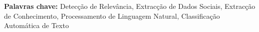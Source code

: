\documentclass[11pt, a4paper, oneside]{thesis} %
\newcommand\blankpage{%
    \null
    \thispagestyle{empty}%
    \addtocounter{page}{-1}%
    \newpage}
\begin{document}
\textbf{Palavras chave: } \keywordnames Detecção de Relevância, Extracção de Dados Sociais, Extracção de Conhecimento, Processamento de Linguagem Natural, Classificação Automática de Texto 


\afterpage{\blankpage}
\clearpage %






\pagestyle{fancy} %

\tableofcontents %

\listoffigures %

\listoftables %







\clearpage %


\renewcommand*\listsymbolname{Acronyms}

\end{document}

